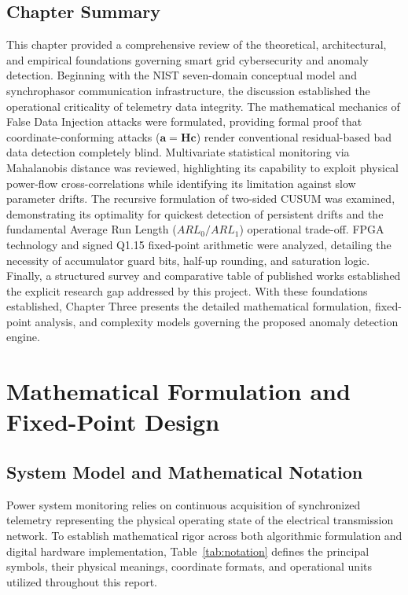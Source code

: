 \documentclass[12pt,a4paper]{report}
\begin{document}
\section{Chapter Summary}
This chapter provided a comprehensive review of the theoretical, architectural, and empirical
foundations governing smart grid cybersecurity and anomaly detection. Beginning with the NIST
seven-domain conceptual model and synchrophasor communication infrastructure, the discussion
established the operational criticality of telemetry data integrity. The mathematical mechanics
of False Data Injection attacks were formulated, providing formal proof that coordinate-conforming
attacks ($\boldsymbol{a} = \boldsymbol{H}\boldsymbol{c}$) render conventional residual-based bad
data detection completely blind. Multivariate statistical monitoring via Mahalanobis distance was
reviewed, highlighting its capability to exploit physical power-flow cross-correlations while
identifying its limitation against slow parameter drifts. The recursive formulation of two-sided
CUSUM was examined, demonstrating its optimality for quickest detection of persistent drifts
and the fundamental Average Run Length ($ARL_0/ARL_1$) operational trade-off. FPGA technology
and signed Q1.15 fixed-point arithmetic were analyzed, detailing the necessity of accumulator
guard bits, half-up rounding, and saturation logic. Finally, a structured survey and comparative
table of published works established the explicit research gap addressed by this project.
With these foundations established, Chapter Three presents the detailed mathematical formulation,
fixed-point analysis, and complexity models governing the proposed anomaly detection engine.


\chapter{Mathematical Formulation and Fixed-Point Design}

\section{System Model and Mathematical Notation}
Power system monitoring relies on continuous acquisition of synchronized telemetry
representing the physical operating state of the electrical transmission network.
To establish mathematical rigor across both algorithmic formulation and digital
hardware implementation, Table~\ref{tab:notation} defines the principal symbols,
their physical meanings, coordinate formats, and operational units utilized
throughout this report.
\end{document}
